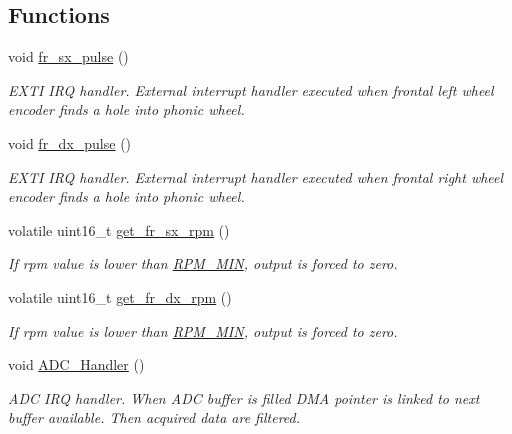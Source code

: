 \subsection*{Functions}
\begin{DoxyCompactItemize}
\item 
void \mbox{\hyperlink{group___board__model__group_ga40f87aeb451c092cf21baf57defc516e}{fr\+\_\+sx\+\_\+pulse}} ()
\begin{DoxyCompactList}\small\item\em E\+X\+TI I\+RQ handler. External interrupt handler executed when frontal left wheel encoder finds a hole into phonic wheel. \end{DoxyCompactList}\item 
void \mbox{\hyperlink{group___board__model__group_ga809e754563f2877e3264fd49483ceac9}{fr\+\_\+dx\+\_\+pulse}} ()
\begin{DoxyCompactList}\small\item\em E\+X\+TI I\+RQ handler. External interrupt handler executed when frontal right wheel encoder finds a hole into phonic wheel. \end{DoxyCompactList}\item 
volatile uint16\+\_\+t \mbox{\hyperlink{group___board__model__group_ga77eb7343baa6cbfd81673dcbd03ac125}{get\+\_\+fr\+\_\+sx\+\_\+rpm}} ()
\begin{DoxyCompactList}\small\item\em If rpm value is lower than \mbox{\hyperlink{group___board__model__group_gafc05771487f188ffa40b6620afc1a9bc}{R\+P\+M\+\_\+\+M\+IN}}, output is forced to zero. \end{DoxyCompactList}\item 
volatile uint16\+\_\+t \mbox{\hyperlink{group___board__model__group_ga3f71b1feaa9b3356080597de5de12f7b}{get\+\_\+fr\+\_\+dx\+\_\+rpm}} ()
\begin{DoxyCompactList}\small\item\em If rpm value is lower than \mbox{\hyperlink{group___board__model__group_gafc05771487f188ffa40b6620afc1a9bc}{R\+P\+M\+\_\+\+M\+IN}}, output is forced to zero. \end{DoxyCompactList}\item 
void \mbox{\hyperlink{group___board__model__group_gaedc241164d501dcbc52cde232333c9cf}{A\+D\+C\+\_\+\+Handler}} ()
\begin{DoxyCompactList}\small\item\em A\+DC I\+RQ handler. When A\+DC buffer is filled D\+MA pointer is linked to next buffer available. Then acquired data are filtered. \end{DoxyCompactList}\item 

\end{DoxyCompactItemize}
